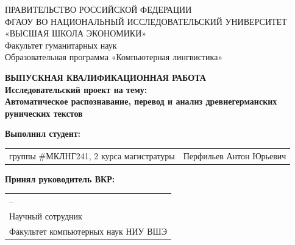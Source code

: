 \begin{titlepage}
\newpage

{
\begin{center}
ПРАВИТЕЛЬСТВО РОССИЙСКОЙ ФЕДЕРАЦИИ\\
ФГАОУ ВО НАЦИОНАЛЬНЫЙ ИССЛЕДОВАТЕЛЬСКИЙ УНИВЕРСИТЕТ\\
«ВЫСШАЯ ШКОЛА ЭКОНОМИКИ»
\\
\bigskip
Факультет гуманитарных наук\\
Образовательная программа «Компьютерная лингвистика»
\end{center}
}

\vspace{7em}

\begin{center}
{\bf ВЫПУСКНАЯ КВАЛИФИКАЦИОННАЯ РАБОТА}\\
{\bf Исследовательский проект на тему:}\\
{\bf Автоматическое распознавание, перевод и анализ древнегерманских рунических текстов}\\
\end{center}

\vspace{2em}

{\bf Выполнил студент: \vspace{2mm}}

{
\begin{tabular}{l@{\hskip 1.5cm}l}
группы \#МКЛНГ241, 2 курса магистратуры & Перфильев Антон Юрьевич 
\end{tabular}}


\vspace{1em}
{\bf Принял руководитель ВКР: \vspace{2mm}}

{
\begin{tabular}{l}
--\\
Научный сотрудник\\
Факультет компьютерных наук НИУ ВШЭ 
\end{tabular}}


\end{titlepage}
